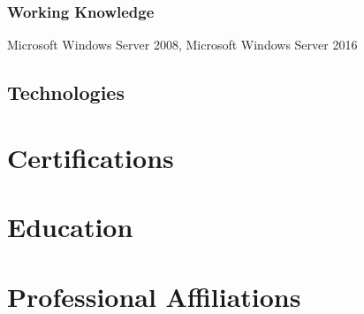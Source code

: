\documentclass{article}
\begin{document}
    \subsubsection{Working Knowledge}
    Microsoft Windows Server 2008, Microsoft Windows Server 2016

  \subsection{Technologies}

\section{Certifications}

\section{Education}

\section{Professional Affiliations}
\end{document}
